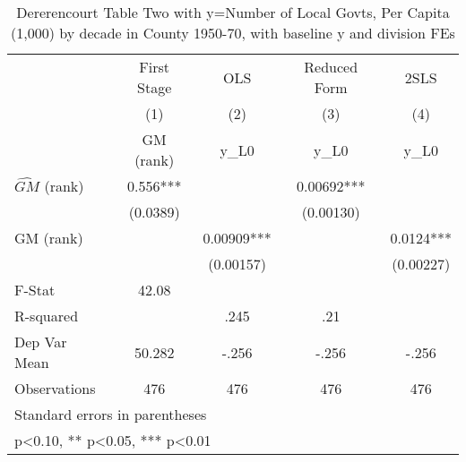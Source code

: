 \begin{table}[htbp]\centering
\def\sym#1{\ifmmode^{#1}\else\(^{#1}\)\fi}
\caption{Dererencourt Table Two with y=Number of Local Govts, Per Capita (1,000) by decade in County 1950-70, with baseline y and division FEs}
\begin{tabular}{l*{4}{c}}
\toprule
                    & First Stage   &         OLS   &Reduced Form   &        2SLS   \\
                    &\multicolumn{1}{c}{(1)}&\multicolumn{1}{c}{(2)}&\multicolumn{1}{c}{(3)}&\multicolumn{1}{c}{(4)}\\
                    &\multicolumn{1}{c}{GM  (rank)}&\multicolumn{1}{c}{y\_L0}&\multicolumn{1}{c}{y\_L0}&\multicolumn{1}{c}{y\_L0}\\
\midrule
$\hat{GM}$ (rank)   &       0.556***&               &     0.00692***&               \\
                    &    (0.0389)   &               &   (0.00130)   &               \\
\addlinespace
GM  (rank)          &               &     0.00909***&               &      0.0124***\\
                    &               &   (0.00157)   &               &   (0.00227)   \\
\midrule
F-Stat              &       42.08   &               &               &               \\
R-squared           &               &        .245   &         .21   &               \\
Dep Var Mean        &      50.282   &       -.256   &       -.256   &       -.256   \\
Observations        &         476   &         476   &         476   &         476   \\
\bottomrule
\multicolumn{5}{l}{\footnotesize Standard errors in parentheses}\\
\multicolumn{5}{l}{\footnotesize * p<0.10, ** p<0.05, *** p<0.01}\\
\end{tabular}
\end{table}
